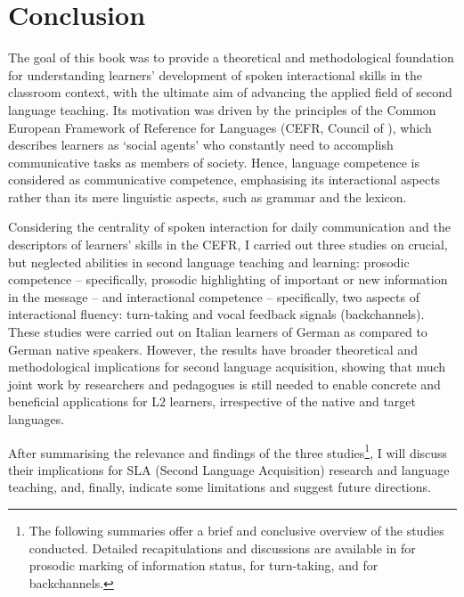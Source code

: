 \section{Conclusion}
\hypertarget{Toc191305960}{}\begin{stylecaption}
\textup{The goal of this book was to provide a theoretical and methodological foundation for understanding learners’ development of spoken interactional skills in the classroom context, with the ultimate aim of advancing the applied field of second language teaching.} \textup{Its motivation was driven by the principles of the Common European Framework of Reference for Languages} \textup{(CEFR, Council of \citealt{Europe2001})}\textup{, which describes learners as ‘social agents’ who constantly need to accomplish communicative tasks as members of society. Hence, language competence is considered as communicative competence, emphasising its interactional aspects rather than its mere linguistic aspects, such as grammar and the lexicon.}
\end{stylecaption}

\begin{stylecaption}
\textup{Considering the centrality of spoken interaction for daily communication and the descriptors of learners’ skills in the CEFR, I carried out three studies on crucial, but neglected abilities in second language teaching and learning: prosodic competence – specifically, prosodic highlighting of important or new information in the message – and interactional competence – specifically, two aspects of interactional fluency: turn-taking and vocal feedback signals (backchannels). These studies were carried out on Italian learners of German as compared to German native speakers. However, the results have broader theoretical and methodological implications for second language acquisition, showing that much joint work by researchers and pedagogues is still needed to enable concrete and beneficial applications for L2 learners, irrespective of the native and target languages.}
\end{stylecaption}

\begin{stylecaption}
\textup{After summarising the relevance and findings of the three studies}\footnote{The following summaries offer a brief and conclusive overview of the studies conducted. Detailed recapitulations and discussions are available in  for prosodic marking of information status,  for turn-taking, and  for backchannels.}\textup{, I will discuss their implications for SLA (Second Language Acquisition) research and language teaching, and, finally, indicate some limitations and suggest future directions.}
\end{stylecaption}

